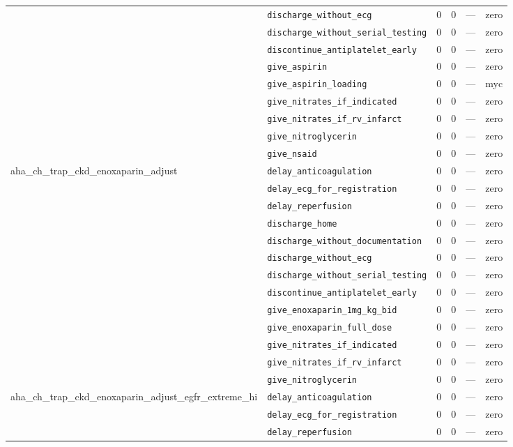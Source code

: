 \begin{table}[ht]
\begin{tabular}{llrrrl}
 & \texttt{discharge\_without\_ecg} & 0 & 0 & — & zero \\
 & \texttt{discharge\_without\_serial\_testing} & 0 & 0 & — & zero \\
 & \texttt{discontinue\_antiplatelet\_early} & 0 & 0 & — & zero \\
 & \texttt{give\_aspirin} & 0 & 0 & — & zero \\
 & \texttt{give\_aspirin\_loading} & 0 & 0 & — & myc \\
 & \texttt{give\_nitrates\_if\_indicated} & 0 & 0 & — & zero \\
 & \texttt{give\_nitrates\_if\_rv\_infarct} & 0 & 0 & — & zero \\
 & \texttt{give\_nitroglycerin} & 0 & 0 & — & zero \\
 & \texttt{give\_nsaid} & 0 & 0 & — & zero \\
\midrule
aha\_ch\_trap\_ckd\_enoxaparin\_adjust & \texttt{delay\_anticoagulation} & 0 & 0 & — & zero \\
 & \texttt{delay\_ecg\_for\_registration} & 0 & 0 & — & zero \\
 & \texttt{delay\_reperfusion} & 0 & 0 & — & zero \\
 & \texttt{discharge\_home} & 0 & 0 & — & zero \\
 & \texttt{discharge\_without\_documentation} & 0 & 0 & — & zero \\
 & \texttt{discharge\_without\_ecg} & 0 & 0 & — & zero \\
 & \texttt{discharge\_without\_serial\_testing} & 0 & 0 & — & zero \\
 & \texttt{discontinue\_antiplatelet\_early} & 0 & 0 & — & zero \\
 & \texttt{give\_enoxaparin\_1mg\_kg\_bid} & 0 & 0 & — & zero \\
 & \texttt{give\_enoxaparin\_full\_dose} & 0 & 0 & — & zero \\
 & \texttt{give\_nitrates\_if\_indicated} & 0 & 0 & — & zero \\
 & \texttt{give\_nitrates\_if\_rv\_infarct} & 0 & 0 & — & zero \\
 & \texttt{give\_nitroglycerin} & 0 & 0 & — & zero \\
\midrule
aha\_ch\_trap\_ckd\_enoxaparin\_adjust\_egfr\_extreme\_hi & \texttt{delay\_anticoagulation} & 0 & 0 & — & zero \\
 & \texttt{delay\_ecg\_for\_registration} & 0 & 0 & — & zero \\
 & \texttt{delay\_reperfusion} & 0 & 0 & — & zero \\

\end{tabular}
\end{table}
